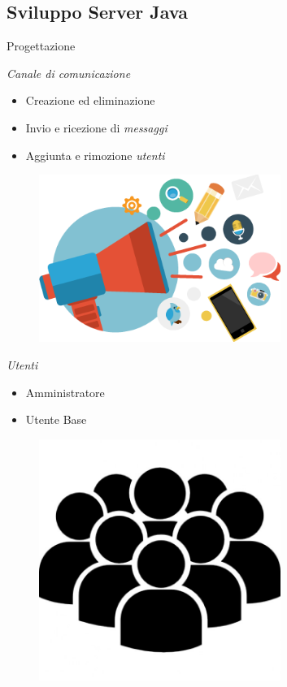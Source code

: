 	\subsection{Sviluppo Server Java}
		\begin{frame}{Progettazione}
			\begin{minipage}{0.6\textwidth}
				\emph{Canale di comunicazione}
					\begin{itemize}
						\item Creazione ed eliminazione
						\item Invio e ricezione di \emph{messaggi}
						\item Aggiunta e rimozione \emph{utenti}
					\end{itemize}
			\end{minipage}
			\begin{minipage}{0.3\textwidth}
				\begin{figure}
					\includegraphics[width=0.7\textwidth]{capitolo_3/immagini/comunicazione.png}
				\end{figure}
			\end{minipage}
			\begin{minipage}{0.6\textwidth}
				\emph{Utenti}
					\begin{itemize}
						\item Amministratore
						\item Utente Base
					\end{itemize}
			\end{minipage}
			\begin{minipage}{0.3\textwidth}
				\begin{figure}
					\includegraphics[width=0.7\textwidth]{capitolo_3/immagini/utenti.jpg}

\end{figure}
\end{minipage}
\end{frame}
